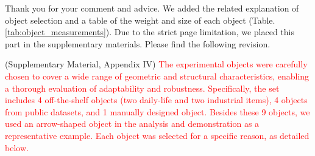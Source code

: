 \documentclass[journal]{IEEEtran}
\newcommand{\rev}[1]{\textcolor{red}{#1}}
\begin{document}
Thank you for your comment and advice. We added the related explanation of object selection and a table of the weight and size of each object (Table. \ref{tab:object_measurements}). Due to the strict page limitation, we placed this part in the supplementary materials. Please find the following revision.

(Supplementary Material, Appendix IV)
\rev{The experimental objects were carefully chosen to cover a wide range of geometric and structural characteristics, enabling a thorough evaluation of adaptability and robustness. Specifically, the set includes 4 off-the-shelf objects (two daily-life and two industrial items), 4 objects from public datasets, and 1 manually designed object. Besides these 9 objects, we used an arrow-shaped object in the analysis and demonstration as a representative example. Each object was selected for a specific reason, as detailed below.}
\end{document}
